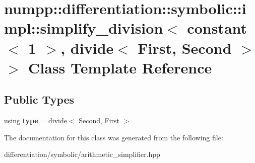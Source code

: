\hypertarget{classnumpp_1_1differentiation_1_1symbolic_1_1impl_1_1simplify__division_3_01constant_3_011_01_4_b4d4ff9717ee8780cd1da6b85e108a8c}{}\section{numpp\+:\+:differentiation\+:\+:symbolic\+:\+:impl\+:\+:simplify\+\_\+division$<$ constant$<$ 1 $>$, divide$<$ First, Second $>$ $>$ Class Template Reference}
\label{classnumpp_1_1differentiation_1_1symbolic_1_1impl_1_1simplify__division_3_01constant_3_011_01_4_b4d4ff9717ee8780cd1da6b85e108a8c}
\subsection*{Public Types}
\begin{DoxyCompactItemize}
\item 
\mbox{\label{classnumpp_1_1differentiation_1_1symbolic_1_1impl_1_1simplify__division_3_01constant_3_011_01_4_b4d4ff9717ee8780cd1da6b85e108a8c_a9a7f360cd14582aa1d9ea0d1a656de55}} 
using {\bfseries type} = \hyperlink{classnumpp_1_1differentiation_1_1symbolic_1_1divide}{divide}$<$ Second, First $>$
\end{DoxyCompactItemize}


The documentation for this class was generated from the following file\+:\begin{DoxyCompactItemize}
\item 
differentiation/symbolic/arithmetic\+\_\+simplifier.\+hpp\end{DoxyCompactItemize}
